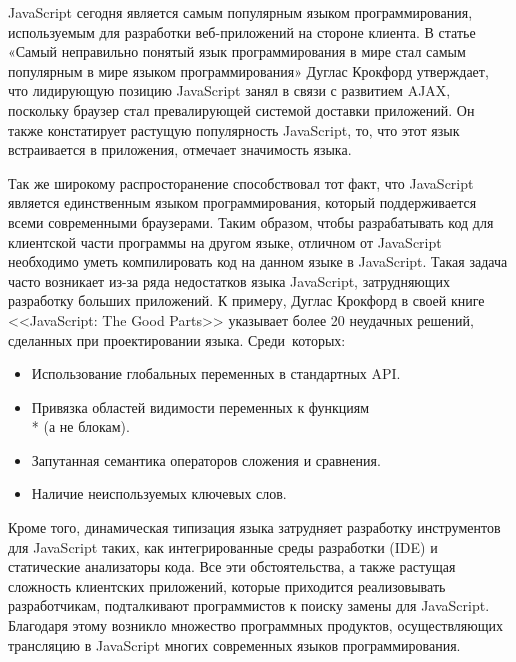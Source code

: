 \startprefacepage


JavaScript сегодня является самым популярным языком программирования, используемым для разработки веб-приложений на стороне клиента\cite{JsUsage, LangUsage}. В статье «Самый неправильно понятый язык программирования в мире стал самым популярным в мире языком программирования»\cite{MostPopLang} Дуглас Крокфорд утверждает, что лидирующую позицию JavaScript занял в связи с развитием AJAX, поскольку браузер стал превалирующей системой доставки приложений. Он также констатирует растущую популярность JavaScript, то, что этот язык встраивается в приложения, отмечает значимость языка.

Так же широкому распросторанение способствовал тот факт, что JavaScript является единственным языком программирования, который поддерживается всеми современными браузерами. Таким образом, чтобы разрабатывать код для клиентской части программы на другом языке, отличном от JavaScript необходимо уметь компилировать код на данном языке  в JavaScript. Такая задача часто возникает из-за ряда недостатков языка JavaScript, затрудняющих разработку больших приложений.
К примеру, Дуглас Крокфорд в своей книге <<JavaScript: The Good Parts>>\cite{GoodParts} указывает более 20 неудачных решений, сделанных при проектировании языка. Среди~которых:
\begin{itemize}
\item Использование глобальных переменных в стандартных API.
\item Привязка областей видимости переменных к функциям\\* (а не блокам).
\item Запутанная семантика операторов сложения и сравнения.
\item Наличие неиспользуемых ключевых слов.
\end{itemize} 

Кроме того, динамическая типизация языка затрудняет разработку инструментов для JavaScript таких, как интегрированные среды разработки (IDE) и статические анализаторы кода. Все эти обстоятельства, а также растущая сложность клиентских приложений, которые приходится реализовывать разработчикам, подталкивают программистов к поиску замены для JavaScript. Благодаря этому возникло множество программных продуктов, осуществляющих трансляцию в JavaScript многих современных языков программирования.\cite{AltJS}

